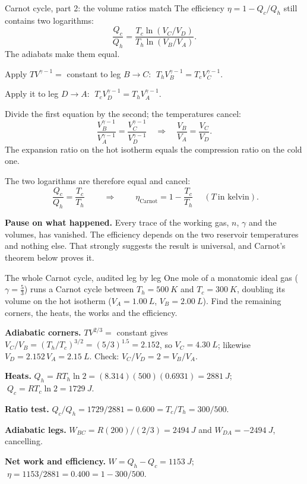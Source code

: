 \begin{derivbox}{Carnot cycle, part 2: the volume ratios match}\label{der:carnot2}
The efficiency $\eta=1-Q_c/Q_h$ still contains two logarithms:
\[
\frac{Q_c}{Q_h}=\frac{T_c\ln(V_C/V_D)}{T_h\ln(V_B/V_A)} .
\]
The adiabats make them equal.

 Apply $TV^{\gamma-1}=$ constant to leg $B\to C$: $\;T_hV_B^{\gamma-1}=T_cV_C^{\gamma-1}$.

 Apply it to leg $D\to A$: $\;T_cV_D^{\gamma-1}=T_hV_A^{\gamma-1}$.

 Divide the first equation by the second; the temperatures cancel:
\[
\frac{V_B^{\gamma-1}}{V_A^{\gamma-1}}=\frac{V_C^{\gamma-1}}{V_D^{\gamma-1}}
\quad\Longrightarrow\quad
\frac{V_B}{V_A}=\frac{V_C}{V_D} .
\]
The expansion ratio on the hot isotherm equals the compression ratio on the cold one.

 The two logarithms are therefore equal and cancel:
\[
\boxed{\;\frac{Q_c}{Q_h}=\frac{T_c}{T_h}\;}
\qquad\Longrightarrow\qquad
\boxed{\;\eta_{\text{Carnot}}=1-\frac{T_c}{T_h}\;}
\quad (T\ \text{in kelvin}).
\]

 \textbf{Pause on what happened.} Every trace of the working gas, $n$, $\gamma$ and the volumes,
has vanished. The efficiency depends on the two reservoir temperatures and nothing else. That strongly
suggests the result is universal, and Carnot's theorem below proves it.
\end{derivbox}

\begin{exbox}{The whole Carnot cycle, audited leg by leg}\label{ex:thermo-carnot}
One mole of a monatomic ideal gas ($\gamma=\tfrac53$) runs a Carnot cycle between $T_h=\SI{500}{K}$ and
$T_c=\SI{300}{K}$, doubling its volume on the hot isotherm ($V_A=\SI{1.00}{L}$, $V_B=\SI{2.00}{L}$). Find the
remaining corners, the heats, the works and the efficiency.

 \textbf{Adiabatic corners.} $TV^{2/3}=$ constant gives $V_C/V_B=(T_h/T_c)^{3/2}=(5/3)^{1.5}=2.152$,
so $V_C=\SI{4.30}{L}$; likewise $V_D=2.152\,V_A=\SI{2.15}{L}$. Check: $V_C/V_D=2=V_B/V_A$.

 \textbf{Heats.} $Q_h=RT_h\ln2=(8.314)(500)(0.6931)=\SI{2881}{J}$; $\;Q_c=RT_c\ln2=\SI{1729}{J}$.

 \textbf{Ratio test.} $Q_c/Q_h=1729/2881=0.600=T_c/T_h=300/500$.

 \textbf{Adiabatic legs.} $W_{BC}=R(200)/(2/3)=\SI{2494}{J}$ and $W_{DA}=\SI{-2494}{J}$, cancelling.

 \textbf{Net work and efficiency.} $W=Q_h-Q_c=\SI{1153}{J}$; $\;\eta=1153/2881=0.400=1-300/500$.
\end{exbox}


